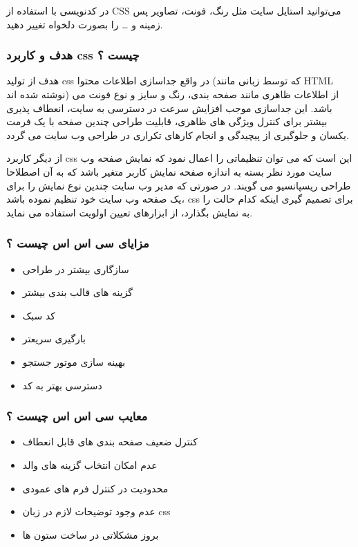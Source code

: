 در کدنویسی با استفاده از CSS می‌توانید استایل سایت مثل رنگ، فونت، تصاویر پس زمینه و … را بصورت دلخواه تغییر دهید.

\subsubsection{هدف و کاربرد css چیست ؟}
هدف از تولید css در واقع جداسازی اطلاعات محتوا (که توسط زبانی مانند HTML نوشته شده اند) از اطلاعات ظاهری مانند صفحه بندی، رنگ و سایز و نوع فونت می باشد. این جداسازی موجب افزایش سرعت در دسترسی به سایت، انعطاف پذیری بیشتر برای کنترل ویژگی های ظاهری، قابلیت طراحی چندین صفحه با یک فرمت یکسان و جلوگیری از پیچیدگی و انجام کارهای تکراری در طراحی وب سایت می گردد.

از دیگر کاربرد css این است که می توان تنظیماتی را اعمال نمود که نمایش صفحه وب سایت مورد نظر بسته به اندازه صفحه نمایش کاربر متغیر باشد که به آن اصطلاحا طراحی ریسپانسیو می گویند. در صورتی که مدیر وب سایت چندین نوع نمایش را برای یک صفحه وب سایت خود تنظیم نموده باشد،  css برای تصمیم گیری اینکه کدام حالت را به نمایش بگذارد، از ابزارهای تعیین اولویت استفاده می نماید.

\subsubsection{مزایای سی اس اس چیست ؟}
\begin{itemize}
	\item 
	سازگاری بیشتر در طراحی
	\item 
	گزینه های قالب بندی بیشتر
	\item 
	کد سبک
	\item 
	بارگیری سریعتر
	\item 
	بهینه سازی موتور جستجو
	\item 
	دسترسی بهتر به کد
\end{itemize}


\subsubsection{معایب سی اس اس چیست ؟}
\begin{itemize}
	\item 
	کنترل ضعیف صفحه بندی های قابل انعطاف
	\item 
	عدم امکان انتخاب گزینه های والد
	\item 
	محدودیت در کنترل فرم های عمودی
	\item 
	عدم وجود توضیحات لازم در زبان css 
	\item 
	بروز مشکلاتی در ساخت ستون ها
\end{itemize}



